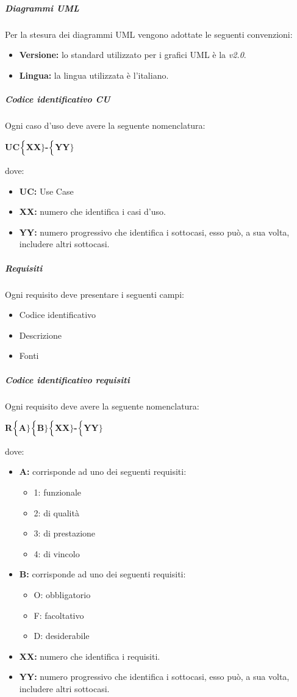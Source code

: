 \subparagraph{Diagrammi UML}
Per la stesura dei diagrammi UML vengono adottate le seguenti convenzioni:
\begin{itemize}
	\item \textbf{Versione:} lo standard utilizzato per i grafici UML è la \textit{v2.0}.
	\item \textbf{Lingua:} la lingua utilizzata è l'italiano.
\end{itemize}

\subparagraph{Codice identificativo CU}
Ogni caso d'uso deve avere la seguente nomenclatura:

\begin{center}
	\textbf{UC$\Bigl\{$XX$\Bigr\}$-$\Bigl\{$YY$\Bigr\}$}
\end{center}
dove:
\begin{itemize}
	\item \textbf{UC:} Use Case
	\item \textbf{{XX}:} numero che identifica i casi d'uso.
	\item \textbf{{YY}:} numero progressivo che identifica i sottocasi, esso può, a sua volta, includere altri sottocasi.
\end{itemize}

\subparagraph{Requisiti}
Ogni requisito deve presentare i seguenti campi:
\begin{itemize}
	\item Codice identificativo
	\item Descrizione
	\item Fonti
\end{itemize}

\subparagraph{Codice identificativo requisiti}
Ogni requisito deve avere la seguente nomenclatura:
\begin{center}
	\textbf{R$\Bigl\{$A$\Bigr\}$$\Bigl\{$B$\Bigr\}$$\Bigl\{$XX$\Bigr\}$-$\Bigl\{$YY$\Bigr\}$}
\end{center}
dove:
\begin{itemize}
	\item \textbf{A:} corrisponde ad uno dei seguenti requisiti:
	\begin{itemize}
		\item 1: funzionale
		\item 2: di qualità
		\item 3: di prestazione
		\item 4: di vincolo
	\end{itemize}
	\item \textbf{B:} corrisponde ad uno dei seguenti requisiti:
	\begin{itemize}
		\item O: obbligatorio
		\item F: facoltativo
		\item D: desiderabile
	\end{itemize}
	\item \textbf{{XX}:} numero che identifica i requisiti.
	\item \textbf{{YY}:} numero progressivo che identifica i sottocasi, esso può, a sua volta, includere altri sottocasi.
\end{itemize}

